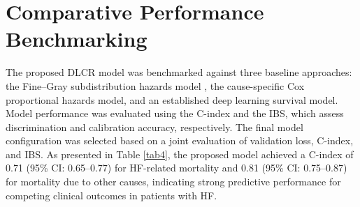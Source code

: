 \documentclass[twoside]{article}
\begin{document}
\section{Comparative Performance Benchmarking }
The proposed DLCR model was benchmarked against three baseline approaches: the Fine–Gray subdistribution hazards model \cite{fine1999}, the cause-specific Cox proportional hazards model, and an established deep learning survival model. Model performance was evaluated using the C-index and the IBS, which assess discrimination and calibration accuracy, respectively. The final model configuration was selected based on a joint evaluation of validation loss, C-index, and IBS. As presented in Table \ref{tab4}, the proposed model achieved a C-index of 0.71 (95\% CI: 0.65–0.77) for HF-related mortality and 0.81 (95\% CI: 0.75–0.87) for mortality due to other causes, indicating strong predictive performance for competing clinical outcomes in patients with HF.
\end{document}
